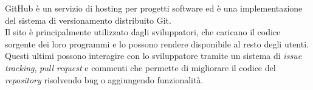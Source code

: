 GitHub è un servizio di hosting per progetti software ed è una implementazione del sistema di versionamento distribuito Git.\\ Il sito è principalmente utilizzato dagli sviluppatori, che caricano il codice sorgente dei loro programmi e lo possono rendere disponibile al resto degli utenti. Questi ultimi possono interagire con lo sviluppatore tramite un sistema di \textit{issue tracking}, \textit{pull request} e commenti che permette di migliorare il codice del \textit{repository} risolvendo bug o aggiungendo funzionalità.